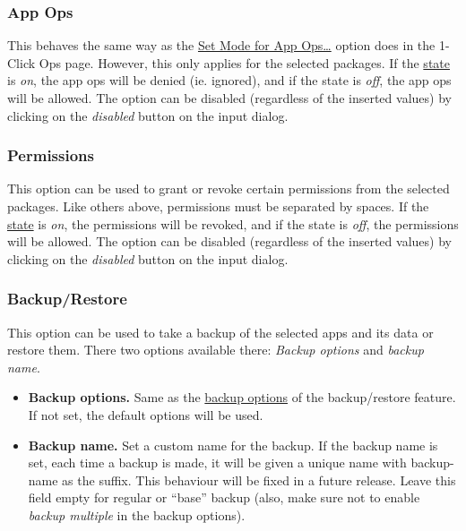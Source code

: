 
\subsubsection{App Ops}
This behaves the same way as the \hyperref[subsec:set-mode-for-app-ops-dots]{Set Mode for App Ops\dots} option does in
the 1-Click Ops page. However, this only applies for the selected packages. If the
\hyperref[subsubsec:profile-state]{state} is \textit{on}, the app ops will be denied (ie. ignored), and if the state is
\textit{off}, the app ops will be allowed. The option can be disabled (regardless of the inserted values) by clicking
on the \textit{disabled} button on the input dialog.

\subsubsection{Permissions}
This option can be used to grant or revoke certain permissions from the selected packages. Like others above,
permissions must be separated by spaces. If the \hyperref[subsubsec:profile-state]{state} is \textit{on}, the
permissions will be revoked, and if the state is \textit{off}, the permissions will be allowed. The option can be
disabled (regardless of the inserted values) by clicking on the \textit{disabled} button on the input dialog.

\subsubsection{Backup/Restore}
This option can be used to take a backup of the selected apps and its data or restore them. There two options available
there: \textit{Backup options} and \textit{backup name}.
\begin{itemize}
    \item \textbf{Backup options.} Same as the \hyperref[subsec:backup-restore-backup-options]{backup options} of the
    backup/restore feature. If not set, the default options will be used.
    \item \textbf{Backup name.} Set a custom name for the backup. If the backup name is set, each time a backup is made,
    it will be given a unique name with backup-name as the suffix. This behaviour will be fixed in a future release.
    Leave this field empty for regular or ``base'' backup (also, make sure not to enable \textit{backup multiple} in the
    backup options).
\end{itemize}

